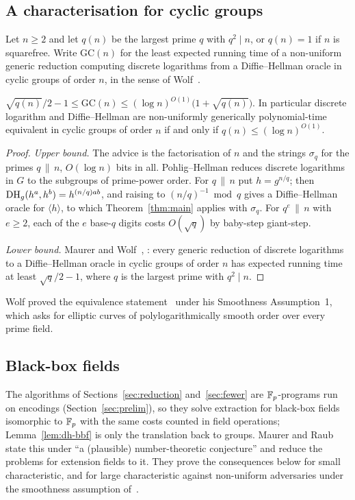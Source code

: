 \subsection{A characterisation for cyclic groups}
Let $n\ge2$ and let $q(n)$ be the largest prime $q$ with $q^2\mid n$, or $q(n)=1$ if $n$ is squarefree. Write
$\mathrm{GC}(n)$ for the least expected running time of a non-uniform generic reduction computing discrete
logarithms from a Diffie--Hellman oracle in cyclic groups of order $n$, in the sense of
Wolf~\cite[\S10.1]{Wol99}.

\begin{theorem}\label{thm:char}
$\sqrt{q(n)}/2-1\le\mathrm{GC}(n)\le(\log n)^{O(1)}\bigl(1+\sqrt{q(n)}\bigr)$. In particular discrete logarithm
and Diffie--Hellman are non-uniformly generically polynomial-time equivalent in cyclic groups of order $n$ if
and only if $q(n)\le(\log n)^{O(1)}$.
\end{theorem}

\begin{proof}
\emph{Upper bound.} The advice is the factorisation of $n$ and the strings $\sigma_q$ for the primes
$q\,\|\,n$, $O(\log n)$ bits in all. Pohlig--Hellman reduces discrete logarithms in $G$ to the subgroups of
prime-power order. For $q\,\|\,n$ put $h=g^{n/q}$; then $\mathrm{DH}_g(h^a,h^b)=h^{(n/q)ab}$, and raising to
$(n/q)^{-1}\bmod q$ gives a Diffie--Hellman oracle for $\langle h\rangle$, to which Theorem~\ref{thm:main}
applies with $\sigma_q$. For $q^e\,\|\,n$ with $e\ge2$, each of the $e$ base-$q$ digits costs $O(\sqrt q)$ by
baby-step giant-step.

\emph{Lower bound.} Maurer and Wolf~\cite{MW98}, \cite[Cor.~10.9]{Wol99}: every generic reduction of discrete
logarithms to a Diffie--Hellman oracle in cyclic groups of order $n$ has expected running time at least
$\sqrt q/2-1$, where $q$ is the largest prime with $q^2\mid n$.
\end{proof}

Wolf proved the equivalence statement~\cite[Thm.~10.10]{Wol99} under his Smoothness Assumption~1, which asks
for elliptic curves of polylogarithmically smooth order over every prime field.

\subsection{Black-box fields}
The algorithms of Sections~\ref{sec:reduction} and~\ref{sec:fewer} are $\mathbb{F}_p$-programs run on encodings
(Section~\ref{sec:prelim}), so they solve extraction for black-box fields isomorphic to $\mathbb{F}_p$ with the same
costs counted in field operations; Lemma~\ref{lem:dh-bbf} is only the translation back to groups. Maurer and
Raub~\cite[Lemma~2]{MR07} state this under ``a (plausible) number-theoretic conjecture'' and reduce the
problems for extension fields to it. They prove the consequences below for small characteristic, and for
large characteristic against non-uniform adversaries under the smoothness assumption
of~\cite{Mau94,MW99}.

